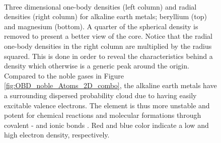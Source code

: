 \begin{figure}
\begin{center}
     \\
  \caption{Three dimensional one-body densities (left column) and radial densities (right column) for alkaline earth metals; beryllium (top) and magnesium (bottom). A quarter of the spherical density is removed to present a better view of the core. Notice that the radial one-body densities in the right column are multiplied by the radius squared. This is done in order to reveal the characteristics behind a density which otherwise is a generic peak around the origin. Compared to the noble gases in Figure \ref{fig:OBD_noble_Atoms_2D_combo}, the alkaline earth metals have a surrounding dispersed probability cloud due to having easily excitable valence electrons. The element is thus more unstable and potent for chemical reactions and molecular formations through covalent - and ionic bonds \cite{UniversityPhysics}. Red and blue color indicate a low and high electron density, respectively.}
  \label{fig:OBD_alkaline_Atoms_2D_combo}
 \end{center}
\end{figure}
 
